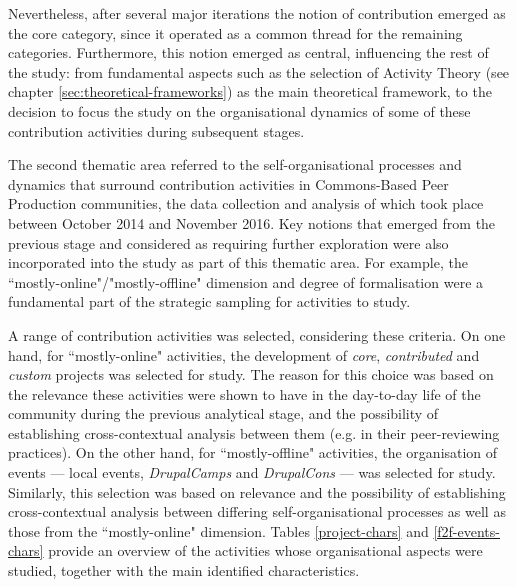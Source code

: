 Nevertheless, after several major iterations the notion of contribution emerged as the core category, since it operated as a common thread for the remaining categories. Furthermore, this notion emerged as central, influencing the rest of the study: from fundamental aspects such as the selection of Activity Theory (see chapter \ref{sec:theoretical-frameworks}) as the main theoretical framework, to the decision to focus the study on the organisational dynamics of some of these contribution activities during subsequent stages.

The second thematic area referred to the self-organisational processes and dynamics that surround contribution activities in Commons-Based Peer Production communities, the data collection and analysis of which took place between October 2014 and November 2016. Key notions that emerged from the previous stage and considered as requiring further exploration were also incorporated into the study as part of this thematic area. For example, the ``mostly-online"/"mostly-offline" dimension and degree of formalisation were a fundamental part of the strategic sampling for activities to study.

A range of contribution activities was selected, considering these criteria. On one hand, for ``mostly-online" activities, the development of \textit{core}, \textit{contributed} and \textit{custom} projects was selected for study. The reason for this choice was based on the relevance these activities were shown to have in the day-to-day life of the community during the previous analytical stage, and the possibility of establishing cross-contextual analysis between them (e.g. in their peer-reviewing practices).  On the other hand, for ``mostly-offline" activities, the organisation of events --- local events, \textit{DrupalCamps} and \textit{DrupalCons} --- was selected for study. Similarly, this selection was based on relevance and the possibility of establishing cross-contextual analysis between differing self-organisational processes as well as those from the ``mostly-online" dimension. Tables \ref{project-chars} and \ref{f2f-events-chars} provide an overview of the activities whose organisational aspects were studied, together with the main identified characteristics.

